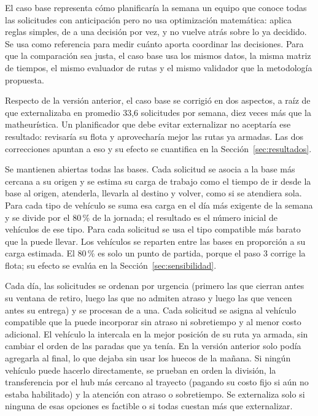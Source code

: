 El caso base representa cómo planificaría la semana un equipo que conoce todas las solicitudes con anticipación pero no usa optimización matemática: aplica reglas simples, de a una decisión por vez, y no vuelve atrás sobre lo ya decidido. Se usa como referencia para medir cuánto aporta coordinar las decisiones. Para que la comparación sea justa, el caso base usa los mismos datos, la misma matriz de tiempos, el mismo evaluador de rutas y el mismo validador que la metodología propuesta.

Respecto de la versión anterior, el caso base se corrigió en dos aspectos, a raíz de que externalizaba en promedio 33,6 solicitudes por semana, diez veces más que la matheurística. Un planificador que debe evitar externalizar no aceptaría ese resultado: revisaría su flota y aprovecharía mejor las rutas ya armadas. Las dos correcciones apuntan a eso y su efecto se cuantifica en la Sección~\ref{sec:resultados}.

 Se mantienen abiertas todas las bases. Cada solicitud se asocia a la base más cercana a su origen y se estima su carga de trabajo como el tiempo de ir desde la base al origen, atenderla, llevarla al destino y volver, como si se atendiera sola. Para cada tipo de vehículo se suma esa carga en el día más exigente de la semana y se divide por el 80\,\% de la jornada; el resultado es el número inicial de vehículos de ese tipo. Para cada solicitud se usa el tipo compatible más barato que la puede llevar. Los vehículos se reparten entre las bases en proporción a su carga estimada. El 80\,\% es solo un punto de partida, porque el paso 3 corrige la flota; su efecto se evalúa en la Sección~\ref{sec:sensibilidad}.

 Cada día, las solicitudes se ordenan por urgencia (primero las que cierran antes su ventana de retiro, luego las que no admiten atraso y luego las que vencen antes su entrega) y se procesan de a una. Cada solicitud se asigna al vehículo compatible que la puede incorporar sin atraso ni sobretiempo y al menor costo adicional. El vehículo la intercala en la mejor posición de su ruta ya armada, sin cambiar el orden de las paradas que ya tenía. En la versión anterior solo podía agregarla al final, lo que dejaba sin usar los huecos de la mañana. Si ningún vehículo puede hacerlo directamente, se prueban en orden la división, la transferencia por el hub más cercano al trayecto (pagando su costo fijo si aún no estaba habilitado) y la atención con atraso o sobretiempo. Se externaliza solo si ninguna de esas opciones es factible o si todas cuestan más que externalizar.

